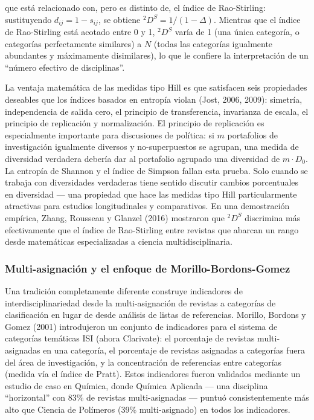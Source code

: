 \documentclass[
]{article}
\begin{document}
que está relacionado con, pero es distinto de, el índice de
Rao-Stirling: sustituyendo \(d_{ij} = 1 - s_{ij}\), se obtiene
\({}^2D^S = 1/(1 - \Delta)\). Mientras que el índice de Rao-Stirling
está acotado entre 0 y 1, \({}^2D^S\) varía de 1 (una única categoría, o
categorías perfectamente similares) a \(N\) (todas las categorías
igualmente abundantes y máximamente disimilares), lo que le confiere la
interpretación de un ``número efectivo de disciplinas''.

La ventaja matemática de las medidas tipo Hill es que satisfacen seis
propiedades deseables que los índices basados en entropía violan (Jost,
2006, 2009): simetría, independencia de salida cero, el principio de
transferencia, invarianza de escala, el principio de replicación y
normalización. El principio de replicación es especialmente importante
para discusiones de política: si \(m\) portafolios de investigación
igualmente diversos y no-superpuestos se agrupan, una medida de
diversidad verdadera debería dar al portafolio agrupado una diversidad
de \(m \cdot D_0\). La entropía de Shannon y el índice de Simpson fallan
esta prueba. Solo cuando se trabaja con diversidades verdaderas tiene
sentido discutir cambios porcentuales en diversidad --- una propiedad
que hace las medidas tipo Hill particularmente atractivas para estudios
longitudinales y comparativos. En una demostración empírica, Zhang,
Rousseau y Glanzel (2016) mostraron que \({}^2D^S\) discrimina más
efectivamente que el índice de Rao-Stirling entre revistas que abarcan
un rango desde matemáticas especializadas a ciencia multidisciplinaria.

\hypertarget{multi-asignaciuxf3n-y-el-enfoque-de-morillo-bordons-gomez}{%
\subsubsection{Multi-asignación y el enfoque de
Morillo-Bordons-Gomez}\label{multi-asignaciuxf3n-y-el-enfoque-de-morillo-bordons-gomez}}

Una tradición completamente diferente construye indicadores de
interdisciplinariedad desde la multi-asignación de revistas a categorías
de clasificación en lugar de desde análisis de listas de referencias.
Morillo, Bordons y Gomez (2001) introdujeron un conjunto de indicadores
para el sistema de categorías temáticas ISI (ahora Clarivate): el
porcentaje de revistas multi-asignadas en una categoría, el porcentaje
de revistas asignadas a categorías fuera del área de investigación, y la
concentración de referencias entre categorías (medida vía el índice de
Pratt). Estos indicadores fueron validados mediante un estudio de caso
en Química, donde Química Aplicada --- una disciplina ``horizontal'' con
83\% de revistas multi-asignadas --- puntuó consistentemente más alto
que Ciencia de Polímeros (39\% multi-asignado) en todos los indicadores.
\end{document}
